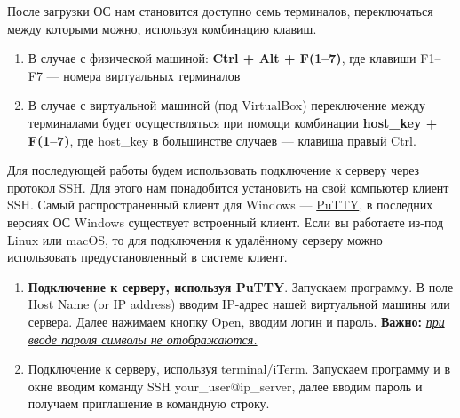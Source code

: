 \documentclass[14pt, a4paper]{article}
\begin{document}
После загрузки ОС нам становится доступно семь терминалов, переключаться между
которыми можно, используя комбинацию клавиш.

\begin{enumerate}
    \item В случае с физической машиной: \textbf{Ctrl + Alt + F(1–7)}, где клавиши F1–F7 — номера
    виртуальных терминалов
    \item В случае с виртуальной машиной (под VirtualBox) переключение между терминалами будет
    осуществляться при помощи комбинации \linebreak \textbf{host\_key + F(1–7)}, где host\_key в большинстве
    случаев — клавиша правый Ctrl.
\end{enumerate}

Для последующей работы будем использовать подключение к серверу через протокол SSH.
Для этого нам понадобится установить на свой компьютер клиент SSH. Самый распространенный
клиент для Windows — \href{https://www.putty.org/}{PuTTY}, в последних версиях ОС Windows существует встроенный клиент. Если
вы работаете из-под Linux или macOS, то для подключения к удалённому серверу можно
использовать предустановленный в системе клиент.

\begin{enumerate}
    \item \textbf{Подключение к серверу, используя PuTTY}. Запускаем программу. В поле Host Name (or IP
    address) вводим IP-адрес нашей виртуальной машины или сервера. Далее нажимаем кнопку
    Open, вводим логин и пароль. \textbf{Важно:} \textit{\uline{при вводе пароля символы не отображаются.}}
    \begin{figure}[H]%
        \centering
        \label{1.0}
    \end{figure}
    \item Подключение к серверу, используя terminal/iTerm. Запускаем программу и в окне вводим
    команду \colorbox{backcolour}{SSH your\_user@ip\_server}, далее вводим пароль и получаем приглашение в
    командную строку.
\end{enumerate}
\end{document}
